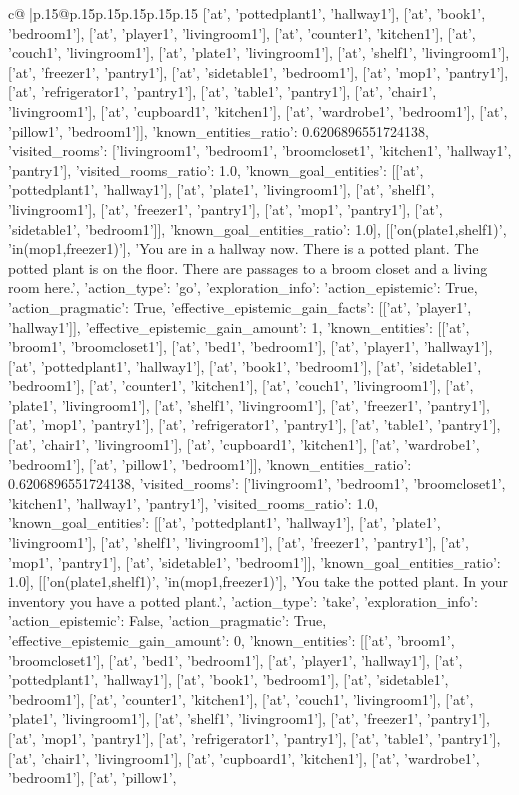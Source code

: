 \documentclass{article}
\begin{document}
{\begin{supertabular}{c@{$\;$}|p{.15\linewidth}@{}p{.15\linewidth}p{.15\linewidth}p{.15\linewidth}p{.15\linewidth}p{.15\linewidth}}
{{{['at', 'pottedplant1', 'hallway1'], ['at', 'book1', 'bedroom1'], ['at', 'player1', 'livingroom1'], ['at', 'counter1', 'kitchen1'], ['at', 'couch1', 'livingroom1'], ['at', 'plate1', 'livingroom1'], ['at', 'shelf1', 'livingroom1'], ['at', 'freezer1', 'pantry1'], ['at', 'sidetable1', 'bedroom1'], ['at', 'mop1', 'pantry1'], ['at', 'refrigerator1', 'pantry1'], ['at', 'table1', 'pantry1'], ['at', 'chair1', 'livingroom1'], ['at', 'cupboard1', 'kitchen1'], ['at', 'wardrobe1', 'bedroom1'], ['at', 'pillow1', 'bedroom1']], 'known_entities_ratio': 0.6206896551724138, 'visited_rooms': ['livingroom1', 'bedroom1', 'broomcloset1', 'kitchen1', 'hallway1', 'pantry1'], 'visited_rooms_ratio': 1.0, 'known_goal_entities': [['at', 'pottedplant1', 'hallway1'], ['at', 'plate1', 'livingroom1'], ['at', 'shelf1', 'livingroom1'], ['at', 'freezer1', 'pantry1'], ['at', 'mop1', 'pantry1'], ['at', 'sidetable1', 'bedroom1']], 'known_goal_entities_ratio': 1.0}}], [['on(plate1,shelf1)', 'in(mop1,freezer1)'], 'You are in a hallway now. There is a potted plant. The potted plant is on the floor. There are passages to a broom closet and a living room here.', {'action_type': 'go', 'exploration_info': {'action_epistemic': True, 'action_pragmatic': True, 'effective_epistemic_gain_facts': [['at', 'player1', 'hallway1']], 'effective_epistemic_gain_amount': 1, 'known_entities': [['at', 'broom1', 'broomcloset1'], ['at', 'bed1', 'bedroom1'], ['at', 'player1', 'hallway1'], ['at', 'pottedplant1', 'hallway1'], ['at', 'book1', 'bedroom1'], ['at', 'sidetable1', 'bedroom1'], ['at', 'counter1', 'kitchen1'], ['at', 'couch1', 'livingroom1'], ['at', 'plate1', 'livingroom1'], ['at', 'shelf1', 'livingroom1'], ['at', 'freezer1', 'pantry1'], ['at', 'mop1', 'pantry1'], ['at', 'refrigerator1', 'pantry1'], ['at', 'table1', 'pantry1'], ['at', 'chair1', 'livingroom1'], ['at', 'cupboard1', 'kitchen1'], ['at', 'wardrobe1', 'bedroom1'], ['at', 'pillow1', 'bedroom1']], 'known_entities_ratio': 0.6206896551724138, 'visited_rooms': ['livingroom1', 'bedroom1', 'broomcloset1', 'kitchen1', 'hallway1', 'pantry1'], 'visited_rooms_ratio': 1.0, 'known_goal_entities': [['at', 'pottedplant1', 'hallway1'], ['at', 'plate1', 'livingroom1'], ['at', 'shelf1', 'livingroom1'], ['at', 'freezer1', 'pantry1'], ['at', 'mop1', 'pantry1'], ['at', 'sidetable1', 'bedroom1']], 'known_goal_entities_ratio': 1.0}}], [['on(plate1,shelf1)', 'in(mop1,freezer1)'], 'You take the potted plant. In your inventory you have a potted plant.', {'action_type': 'take', 'exploration_info': {'action_epistemic': False, 'action_pragmatic': True, 'effective_epistemic_gain_amount': 0, 'known_entities': [['at', 'broom1', 'broomcloset1'], ['at', 'bed1', 'bedroom1'], ['at', 'player1', 'hallway1'], ['at', 'pottedplant1', 'hallway1'], ['at', 'book1', 'bedroom1'], ['at', 'sidetable1', 'bedroom1'], ['at', 'counter1', 'kitchen1'], ['at', 'couch1', 'livingroom1'], ['at', 'plate1', 'livingroom1'], ['at', 'shelf1', 'livingroom1'], ['at', 'freezer1', 'pantry1'], ['at', 'mop1', 'pantry1'], ['at', 'refrigerator1', 'pantry1'], ['at', 'table1', 'pantry1'], ['at', 'chair1', 'livingroom1'], ['at', 'cupboard1', 'kitchen1'], ['at', 'wardrobe1', 'bedroom1'], ['at', 'pillow1', }}}
\end{supertabular}}
\end{document}
